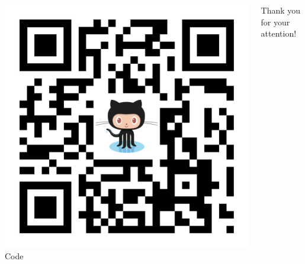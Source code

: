 \documentclass[aspectratio=169]{beamer}
\begin{document}
\begin{frame}

\begin{columns}
    \begin{column}{0.20\textwidth}
	\begin{center}	
	\bigskip
	\includegraphics[scale=0.07]{assets/qrcode-github.pdf}
	Code
	\end{center}
    \end{column}

   \begin{column}{0.58\textwidth}
\begin{center}	
        \large{Thank you for your attention!}
\end{center}
    \end{column}


\end{columns}
\end{frame}
\end{document}
